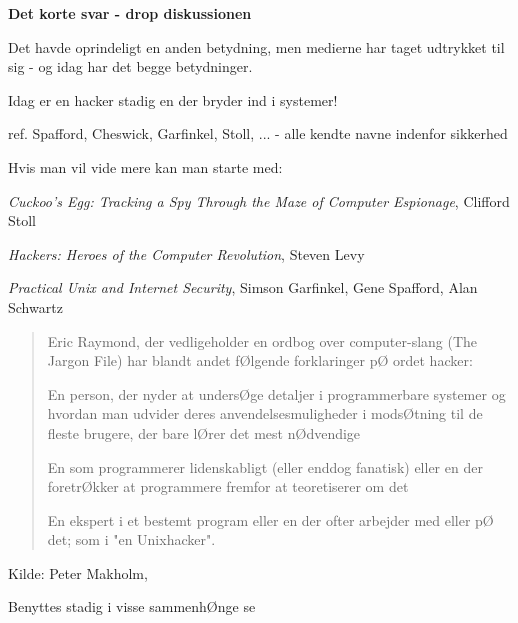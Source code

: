 \documentclass[20pt,landscape,a4paper]{foils}
\begin{document}
\myquestionspage


{\bfseries Det korte svar - drop diskussionen}

Det havde oprindeligt en anden betydning, men medierne har taget
udtrykket til sig - og idag har det begge betydninger.

{\color{red}\hlkbig Idag er en hacker stadig en der bryder ind i systemer!}

ref. Spafford, Cheswick, Garfinkel, Stoll, ...
- alle kendte navne indenfor sikkerhed

Hvis man vil vide mere kan man starte med:
\begin{list2}
\item \emph{Cuckoo's Egg: Tracking a Spy Through the Maze of Computer
 Espionage},  Clifford Stoll
\item \emph{Hackers: Heroes of the Computer Revolution},
Steven Levy
\item \emph{Practical Unix and Internet Security},
Simson Garfinkel, Gene Spafford, Alan Schwartz
\end{list2}



\begin{quote}
Eric Raymond, der vedligeholder en ordbog over computer-slang (The Jargon File) har blandt andet fØlgende forklaringer pØ ordet hacker:
\begin{list2}
\item En person, der nyder at undersØge detaljer i programmerbare systemer og hvordan man udvider deres anvendelsesmuligheder i modsØtning til de fleste brugere, der bare lØrer det mest nØdvendige
\item En som programmerer lidenskabligt (eller enddog fanatisk) eller en der foretrØkker at programmere fremfor at teoretiserer om det
\item En ekspert i et bestemt program eller en der ofter arbejder med eller pØ det; som i "en Unixhacker".
\end{list2}
\end{quote}

\begin{list1}
\item Kilde: Peter Makholm, 
\item Benyttes stadig i visse sammenhØnge se 
\end{list1}
\end{document}
